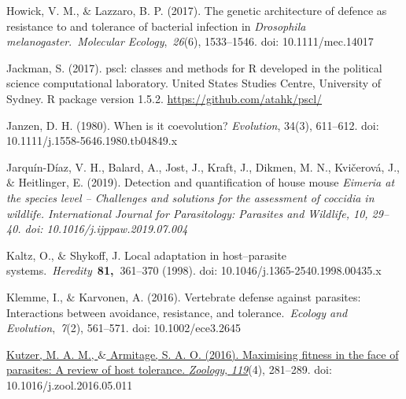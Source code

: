 \documentclass[12pt]{article}
\renewcommand{\_}{\kern-1.5pt\textunderscore\kern-1.5pt}
\begin{document}
\begin{FlushLeft}
Howick, V. M., $\&$  Lazzaro, B. P. (2017). The genetic architecture of defence as resistance to and tolerance of bacterial infection in \textit{Drosophila melanogaster}. \textit{Molecular Ecology}, \textit{26}(6), 1533–1546. doi: 10.1111/mec.14017 
\end{FlushLeft}\par

\begin{FlushLeft}
Jackman, S. (2017). pscl: classes and methods for R developed in the political science computational laboratory. United States Studies Centre, University of Sydney. R package version 1.5.2. \href{https://github.com/atahk/pscl/}{https://github.com/atahk/pscl/}
\end{FlushLeft}\par

\begin{FlushLeft}
Janzen, D. H. (1980). When is it coevolution? \textit{Evolution}, 34(3), 611–612. doi: 10.1111/j.1558-5646.1980.tb04849.x
\end{FlushLeft}\par

\begin{FlushLeft}
Jarquín-Díaz, V. H., Balard, A., Jost, J., Kraft, J., Dikmen, M. N., Kvičerová, J., $\&$  Heitlinger, E. (2019). Detection and quantification of house mouse \textit{Eimeria at the species level – Challenges and solutions for the assessment of coccidia in wildlife. International Journal for Parasitology: Parasites and Wildlife, 10, 29–40. doi: 10.1016/j.ijppaw.2019.07.004}
\end{FlushLeft}\par

\begin{FlushLeft}
Kaltz, O., $\&$  Shykoff, J. Local adaptation in host–parasite systems. \textit{Heredity} \textbf{81, }361–370 (1998). doi: 10.1046/j.1365-2540.1998.00435.x
\end{FlushLeft}\par

\begin{FlushLeft}
Klemme, I., $\&$  Karvonen, A. (2016). Vertebrate defense against parasites: Interactions between avoidance, resistance, and tolerance. \textit{Ecology and Evolution}, \textit{7}(2), 561–571. doi: 10.1002/ece3.2645
\end{FlushLeft}\par

\begin{FlushLeft}
\href{https://www.zotero.org/google-docs/?I2LRxy}{Kutzer, M. A. M., $\&$  Armitage, S. A. O. (2016). Maximising fitness in the face of parasites: A review of host tolerance. }\href{https://www.zotero.org/google-docs/?I2LRxy}{\textit{Zoology}\href{https://www.zotero.org/google-docs/?I2LRxy}{}, }\href{https://www.zotero.org/google-docs/?I2LRxy}{\textit{119}}(4), 281–289. doi: 10.1016/j.zool.2016.05.011
\end{FlushLeft}\par
\end{document}
